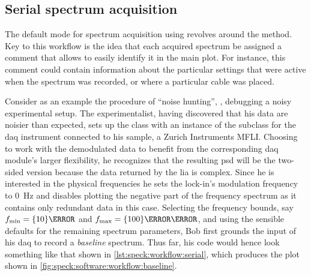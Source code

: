 \subsection{Serial spectrum acquisition}\label{subsec:speck:software:features:serial}
The default mode for spectrum acquisition using \pyspeck revolves around the  method.
Key to this workflow is the idea that each acquired spectrum be assigned a comment that allows to easily identify it in the main plot.
For instance, this comment could contain information about the particular settings that were active when the spectrum was recorded, or where a particular cable was placed.

Consider as an example the procedure of \enquote{noise hunting}, \ie, debugging a noisy experimental setup.
The experimentalist,
having discovered that his data are noisier than expected, sets up the  class with an instance of the  subclass for the \gls{daq} instrument connected to his sample, a Zurich Instruments MFLI.
Choosing to work with the demodulated data to benefit from the corresponding \acrshort{daq} module's larger flexibility, he recognizes that the resulting \gls{psd} will be the two-sided version because the data returned by the \gls{lia} is complex.
Since he is interested in the physical frequencies
he sets the lock-in's modulation frequency to \qty{0}{\hertz} and disables plotting the negative part of the frequency spectrum as it contains only redundant data in this case.
Selecting the frequency bounds, say $\fmin = \qty{10}{\hertz}$ and $\fmax = \qty{100}{\kilo\hertz}$, and using the sensible defaults for the remaining spectrum parameters, Bob first grounds the input of his \gls{daq} to record a \emph{baseline} spectrum.
Thus far, his code would hence look something like that shown in \cref{lst:speck:workflow:serial}, which produces the plot shown in \cref{fig:speck:software:workflow:baseline}.

